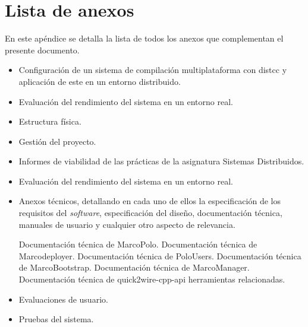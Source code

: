 \chapter{Lista de anexos}
\label{listaanexos}
En este apéndice se detalla la lista de todos los anexos que complementan el presente documento.
\begin{itemize}[noitemsep]
\item Configuración de un sistema de compilación multiplataforma con distcc y aplicación de este en un entorno distribuido.
\item Evaluación del rendimiento del sistema en un entorno real.
\item Estructura física.
\item Gestión del proyecto.
\item Informes de viabilidad de las prácticas de la asignatura Sistemas Distribuidos.
\item Evaluación del rendimiento del sistema en un entorno real.
\item Anexos técnicos, detallando en cada uno de ellos la especificación de los requisitos del \textit{software}, especificación del diseño, documentación técnica, manuales de usuario y cualquier otro aspecto de relevancia.

\subitem Documentación técnica de MarcoPolo.
\subitem Documentación técnica de Marcodeployer.
\subitem Documentación técnica de PoloUsers.
\subitem Documentación técnica de MarcoBootstrap.
\subitem Documentación técnica de MarcoManager.
\subitem Documentación técnica de quick2wire-cpp-api herramientas relacionadas.

\item Evaluaciones de usuario.
\item Pruebas del sistema.
\end{itemize}